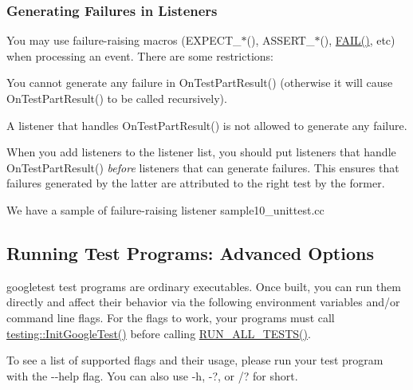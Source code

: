 \subsubsection*{Generating Failures in Listeners}

You may use failure-\/raising macros ({\ttfamily E\+X\+P\+E\+C\+T\+\_\+$\ast$()}, {\ttfamily A\+S\+S\+E\+R\+T\+\_\+$\ast$()}, {\ttfamily \mbox{\hyperlink{googletest-master_2googletest_2include_2gtest_2gtest_8h_a3e26a8d27caa386ed0ea7ce9d5b7c4ed}{F\+A\+I\+L()}}}, etc) when processing an event. There are some restrictions\+:


\begin{DoxyEnumerate}
\item You cannot generate any failure in {\ttfamily On\+Test\+Part\+Result()} (otherwise it will cause {\ttfamily On\+Test\+Part\+Result()} to be called recursively).
\end{DoxyEnumerate}
\begin{DoxyEnumerate}
\item A listener that handles {\ttfamily On\+Test\+Part\+Result()} is not allowed to generate any failure.
\end{DoxyEnumerate}

When you add listeners to the listener list, you should put listeners that handle {\ttfamily On\+Test\+Part\+Result()} {\itshape before} listeners that can generate failures. This ensures that failures generated by the latter are attributed to the right test by the former.

We have a sample of failure-\/raising listener sample10\+\_\+unittest.\+cc

\subsection*{Running Test Programs\+: Advanced Options}

googletest test programs are ordinary executables. Once built, you can run them directly and affect their behavior via the following environment variables and/or command line flags. For the flags to work, your programs must call {\ttfamily \mbox{\hyperlink{namespacetesting_afd726ae08c9bd16dc52f78c822d9946b}{testing\+::\+Init\+Google\+Test()}}} before calling {\ttfamily \mbox{\hyperlink{googletest-master_2googletest_2include_2gtest_2gtest_8h_a853a3792807489591d3d4a2f2ff9359f}{R\+U\+N\+\_\+\+A\+L\+L\+\_\+\+T\+E\+S\+T\+S()}}}.

To see a list of supported flags and their usage, please run your test program with the {\ttfamily -\/-\/help} flag. You can also use {\ttfamily -\/h}, {\ttfamily -\/?}, or {\ttfamily /?} for short.

